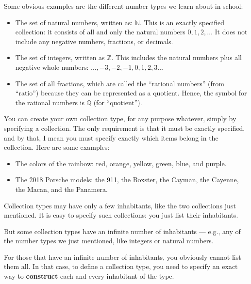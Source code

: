 \documentclass{book}
\numberwithin{equation}{chapter}
\newcommand{\vocab}{\textbf}
\begin{document}
\noindent
Some obvious examples are the different number types we learn about in school:

\begin{itemize}

\item{The set of natural numbers, written as: $\mathbb{N}$. This is an exactly specified collection: it consists of all and only the natural numbers $0, 1, 2, \ldots$ It does not include any negative numbers, fractions, or decimals.}

\item{The set of integers, written as $\mathbb{Z}$. This includes the natural numbers plus all negative whole numbers: $\ldots, -3, -2, -1, 0, 1, 2, 3 \ldots$}

\item{The set of all fractions, which are called the ``rational numbers'' (from ``ratio'') because they can be represented as a quotient. Hence, the symbol for the rational numbers is $\mathbb{Q}$ (for ``quotient'').}

\end{itemize}

\noindent
You can create your own collection type, for any purpose whatever, simply by specifying a collection. The only requirement is that it must be exactly specified, and by that, I mean you must specify exactly which items belong in the collection. Here are some examples:

\begin{itemize}

\item{The colors of the rainbow: red, orange, yellow, green, blue, and purple.}

\item{The 2018 Porsche models: the 911, the Boxster, the Cayman, the Cayenne, the Macan, and the Panamera.}

\end{itemize}

\noindent
Collection types may have only a few inhabitants, like the two collections just mentioned. It is easy to specify such collections: you just list their inhabitants.

But some collection types have an infinite number of inhabitants --- e.g., any of the number types we just mentioned, like integers or natural numbers.

For those that have an infinite number of inhabitants, you obviously cannot list them all. In that case, to define a collection type, you need to specify an exact way to \vocab{construct} each and every inhabitant of the type.
\end{document}
